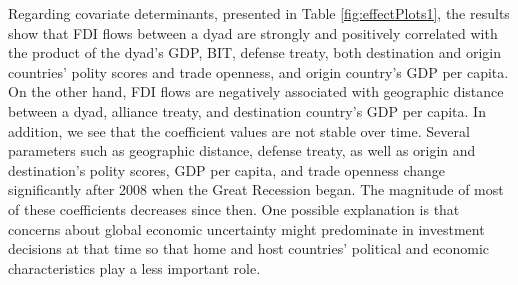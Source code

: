 \documentclass[reqno,onecolumn,letterpaper,12pt]{article}
\begin{document}
Regarding covariate determinants, presented in Table \ref{fig:effectPlots1}, the results show that FDI flows between a dyad are strongly and positively correlated with the product of the dyad's GDP, BIT, defense treaty, both destination and origin countries' polity scores and trade openness, and origin country's GDP per capita. On the other hand, FDI flows are negatively associated with geographic distance between a dyad, alliance treaty, and destination country's GDP per capita. In addition, we see that the coefficient values are not stable over time. Several parameters such as geographic distance, defense treaty, as well as origin and destination's polity scores, GDP per capita, and trade openness change significantly after 2008 when the Great Recession began. The magnitude of most of these coefficients decreases since then. One possible explanation is that concerns about global economic uncertainty might predominate in investment decisions at that time so that home and host countries' political and economic characteristics play a less important role.
\end{document}
